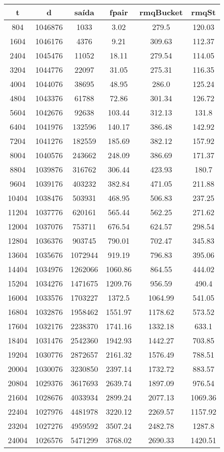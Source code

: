 \begin{tabular}{|c|c|c|c|c|c|}
\hline
\textbf{t} & \textbf{d} & \textbf{saída} & \textbf{fpair} & \textbf{rmqBucket} & \textbf{rmqSt}\\
\hline
804 & 1046876 & 1033 & 3.02 & 279.5 & 120.03\\
\hline
1604 & 1046176 & 4376 & 9.21 & 309.63 & 112.37\\
\hline
2404 & 1045476 & 11052 & 18.11 & 279.54 & 114.05\\
\hline
3204 & 1044776 & 22097 & 31.05 & 275.31 & 116.35\\
\hline
4004 & 1044076 & 38695 & 48.95 & 286.0 & 125.24\\
\hline
4804 & 1043376 & 61788 & 72.86 & 301.34 & 126.72\\
\hline
5604 & 1042676 & 92638 & 103.44 & 312.13 & 131.8\\
\hline
6404 & 1041976 & 132596 & 140.17 & 386.48 & 142.92\\
\hline
7204 & 1041276 & 182559 & 185.69 & 382.12 & 157.92\\
\hline
8004 & 1040576 & 243662 & 248.09 & 386.69 & 171.37\\
\hline
8804 & 1039876 & 316762 & 306.44 & 423.93 & 180.7\\
\hline
9604 & 1039176 & 403232 & 382.84 & 471.05 & 211.88\\
\hline
10404 & 1038476 & 503931 & 468.95 & 506.83 & 237.25\\
\hline
11204 & 1037776 & 620161 & 565.44 & 562.25 & 271.62\\
\hline
12004 & 1037076 & 753711 & 676.54 & 624.57 & 298.54\\
\hline
12804 & 1036376 & 903745 & 790.01 & 702.47 & 345.83\\
\hline
13604 & 1035676 & 1072944 & 919.19 & 796.83 & 395.06\\
\hline
14404 & 1034976 & 1262066 & 1060.86 & 864.55 & 444.02\\
\hline
15204 & 1034276 & 1471675 & 1209.76 & 956.59 & 490.4\\
\hline
16004 & 1033576 & 1703227 & 1372.5 & 1064.99 & 541.05\\
\hline
16804 & 1032876 & 1958462 & 1551.97 & 1178.62 & 573.52\\
\hline
17604 & 1032176 & 2238370 & 1741.16 & 1332.18 & 633.1\\
\hline
18404 & 1031476 & 2542360 & 1942.93 & 1442.27 & 703.85\\
\hline
19204 & 1030776 & 2872657 & 2161.32 & 1576.49 & 788.51\\
\hline
20004 & 1030076 & 3230850 & 2397.14 & 1732.72 & 883.57\\
\hline
20804 & 1029376 & 3617693 & 2639.74 & 1897.09 & 976.54\\
\hline
21604 & 1028676 & 4033934 & 2899.24 & 2077.13 & 1069.36\\
\hline
22404 & 1027976 & 4481978 & 3220.12 & 2269.57 & 1157.92\\
\hline
23204 & 1027276 & 4959592 & 3507.24 & 2482.78 & 1287.8\\
\hline
24004 & 1026576 & 5471299 & 3768.02 & 2690.33 & 1420.51\\
\hline
\end{tabular}
